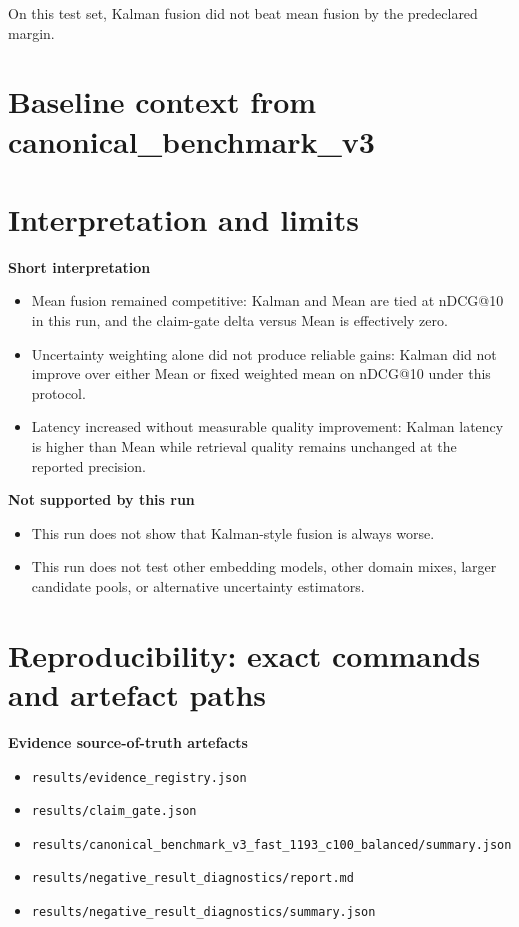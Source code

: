 \documentclass[11pt]{article}
\begin{document}
On this test set, Kalman fusion did not beat mean fusion by the predeclared margin.

\section{Baseline context from canonical\_benchmark\_v3}
\begin{table}[ht]
\centering
\caption{Concise baseline comparison from \texttt{canonical\_benchmark\_v3\_fast\_1193\_c100\_balanced} ($n=1193$, domain-balanced, \texttt{max\_candidates}=100). The ``oracle specialist'' row is the hard-routing top-1 proxy included in the canonical suite.}
\label{tab:baseline-context}

\end{table}

\section{Interpretation and limits}
\textbf{Short interpretation}
\begin{itemize}
  \item Mean fusion remained competitive: Kalman and Mean are tied at nDCG@10 in this run, and the claim-gate delta versus Mean is effectively zero.
  \item Uncertainty weighting alone did not produce reliable gains: Kalman did not improve over either Mean or fixed weighted mean on nDCG@10 under this protocol.
  \item Latency increased without measurable quality improvement: Kalman latency is higher than Mean while retrieval quality remains unchanged at the reported precision.
\end{itemize}

\textbf{Not supported by this run}
\begin{itemize}
  \item This run does not show that Kalman-style fusion is always worse.
  \item This run does not test other embedding models, other domain mixes, larger candidate pools, or alternative uncertainty estimators.
\end{itemize}

\section{Reproducibility: exact commands and artefact paths}
\textbf{Evidence source-of-truth artefacts}
\begin{itemize}
  \item \texttt{results/evidence\_registry.json}
  \item \texttt{results/claim\_gate.json}
  \item \texttt{results/canonical\_benchmark\_v3\_fast\_1193\_c100\_balanced/summary.json}
  \item \texttt{results/negative\_result\_diagnostics/report.md}
  \item \texttt{results/negative\_result\_diagnostics/summary.json}
\end{itemize}
\end{document}
